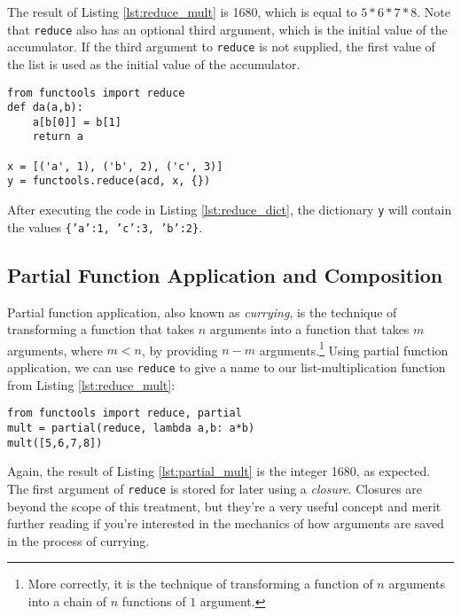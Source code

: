 \documentclass[ignorenonframetext,red]{beamer}
\begin{document}
\noindent The result of Listing \ref{lst:reduce_mult} is 1680, which is equal to $5 * 6 * 7 * 8$. Note that \texttt{reduce} also has an optional third argument, which is the initial value of the accumulator. If the third argument to \texttt{reduce} is not supplied, the first value of the list is used as the initial value of the accumulator.

\begin{frame}[fragile]
\begin{lstlisting}[style=python,caption={Convert to Dictionary},label={lst:reduce_dict}]
from functools import reduce
def da(a,b):
    a[b[0]] = b[1]
    return a

x = [('a', 1), ('b', 2), ('c', 3)]
y = functools.reduce(acd, x, {})
\end{lstlisting}
\end{frame}

\noindent After executing the code in Listing \ref{lst:reduce_dict}, the dictionary \texttt{y} will contain the values \texttt{\{'a':1, 'c':3, 'b':2\}}.

\subsection{Partial Function Application and Composition}
Partial function application, also known as \textit{currying}, is the technique of transforming a function that takes $n$ arguments into a function that takes $m$ arguments, where $m < n$, by providing $n-m$ arguments.\footnote{More correctly, it is the technique of transforming a function of $n$ arguments into a chain of $n$ functions of $1$ argument.} Using partial function application, we can use \texttt{reduce} to give a name to our list-multiplication function from Listing \ref{lst:reduce_mult}:

\begin{frame}[fragile]
\begin{lstlisting}[style=python,caption={List Multiplication},label={lst:partial_mult}]
from functools import reduce, partial
mult = partial(reduce, lambda a,b: a*b)
mult([5,6,7,8])
\end{lstlisting}
\end{frame}

\noindent Again, the result of Listing \ref{lst:partial_mult} is the integer 1680, as expected. The first argument of \texttt{reduce} is stored for later using a \textit{closure}. Closures are beyond the scope of this treatment, but they're a very useful concept and merit further reading if you're interested in the mechanics of how arguments are saved in the process of currying.
\end{document}
